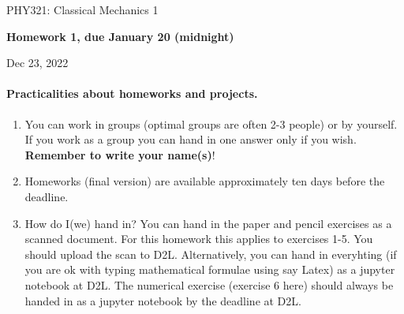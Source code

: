 \documentclass[%
oneside,                 %
final,                   %
10pt]{article}
\begin{document}

\newcommand{\exercisesection}[1]{\subsection*{#1}}






\thispagestyle{empty}

\begin{center}
{\LARGE\bf
\begin{spacing}{1.25}
PHY321: Classical Mechanics 1
\end{spacing}
}
\end{center}


\begin{center}
{\bf Homework 1, due January 20 (midnight)${}^{}$} \\ [0mm]
\end{center}

\begin{center}
\end{center}
    

\begin{center}
Dec 23, 2022
\end{center}

\vspace{1cm}


\paragraph{Practicalities about  homeworks and projects.}
\begin{enumerate}
\item You can work in groups (optimal groups are often 2-3 people) or by yourself. If you work as a group you can hand in one answer only if you wish. \textbf{Remember to write your name(s)}!

\item Homeworks (final version) are available approximately ten days before the  deadline. 

\item How do I(we)  hand in?  You can hand in the paper and pencil exercises as a scanned document. For this homework this applies to exercises 1-5. You should upload the scan to D2L. Alternatively, you can hand in everyhting (if you are ok with typing mathematical formulae using say Latex) as a jupyter notebook at D2L. The numerical exercise (exercise 6 here) should always be handed in as a jupyter notebook by the deadline at D2L. 
\end{enumerate}
\end{document}
